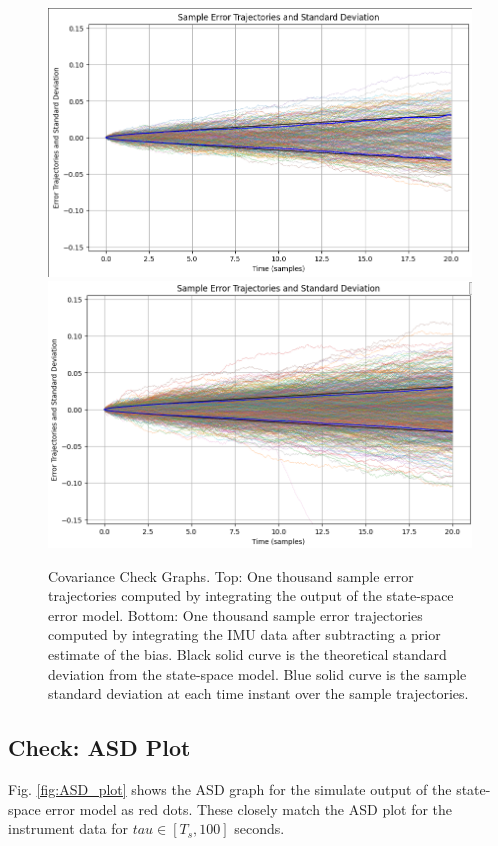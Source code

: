 \documentclass[letter,twocolumn]{article}
\begin{document}
\begin{figure}[bth]
	\centering
	\includegraphics[trim=0.1in 0in 0in 0.1in, clip, width=\columnwidth]{figure/cov_sim}
	\includegraphics[trim=0in 0in 0in 0.01in, clip, width=\columnwidth]{figure/cov_instrument}
	\caption{Covariance Check Graphs. 
		Top: One thousand sample error trajectories computed by integrating the output of the state-space error model. 
		Bottom: One thousand sample error trajectories computed by integrating the IMU data after subtracting a prior estimate of the bias.
		Black solid curve is the theoretical standard deviation from the state-space model. 
		Blue solid curve is the sample standard deviation at each time instant over the sample trajectories. }
	\label{fig:cov_plot}
\end{figure}


\subsection{Check: ASD Plot}
Fig. \ref{fig:ASD_plot} shows the ASD graph for the simulate output of the state-space error model as red dots. These closely match the ASD plot for the instrument data for $tau\in[T_s,100]$ seconds. 
\end{document}
